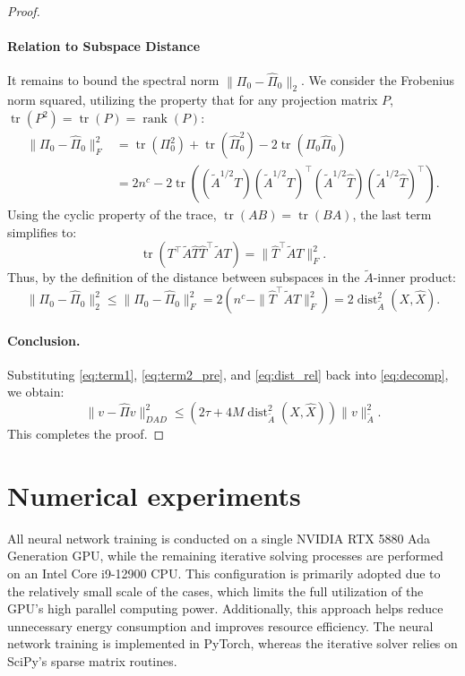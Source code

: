 \documentclass{article}
\DeclareMathOperator{\Dist}{dist}
\theoremstyle{definition}
\theoremstyle{remark}
\begin{document}
\begin{proof}
    \paragraph{Relation to Subspace Distance}
    It remains to bound the spectral norm $\|\Pi_0 - \hat{\Pi}_0\|_2$. We consider the Frobenius norm squared, utilizing the property that for any projection matrix $P$, $\operatorname{tr}(P^2) = \operatorname{tr}(P) = \operatorname{rank}(P)$:
    \[
    \begin{aligned}
        \|\Pi_0 - \hat{\Pi}_0\|_F^2 
        &= \operatorname{tr}(\Pi_0^2) + \operatorname{tr}(\hat{\Pi}_0^2) - 2\operatorname{tr}(\Pi_0 \hat{\Pi}_0) \\
        &= 2 n^c - 2\operatorname{tr}\left( (\tilde{A}^{1/2} T) (\tilde{A}^{1/2} T)^\top (\tilde{A}^{1/2} \hat{T}) (\tilde{A}^{1/2} \hat{T})^\top \right).
    \end{aligned}
    \]
    Using the cyclic property of the trace, $\operatorname{tr}(AB) = \operatorname{tr}(BA)$, the last term simplifies to:
    \[
        \operatorname{tr}\left( T^\top \tilde{A} \hat{T} \hat{T}^\top \tilde{A} T \right) = \| \hat{T}^\top \tilde{A} T \|_F^2.
    \]
    Thus, by the definition of the distance between subspaces in the $\tilde{A}$-inner product:
    \begin{equation}\label{eq:dist_rel}
        \|\Pi_0 - \hat{\Pi}_0\|_2^2 \leq \|\Pi_0 - \hat{\Pi}_0\|_F^2 = 2 \left( n^c - \| \hat{T}^\top \tilde{A} T \|_F^2 \right) = 2 \Dist_{\tilde{A}}^2(X, \hat{X}).
    \end{equation}
    
    \paragraph{Conclusion.}
    Substituting \cref{eq:term1}, \cref{eq:term2_pre}, and \cref{eq:dist_rel} back into \cref{eq:decomp}, we obtain:
    \[
        \|v - \hat{\Pi}v\|_{D A D}^2 \leq \left( 2\tau + 4 M \Dist_{\tilde{A}}^2(X, \hat{X}) \right) \|v\|_{\tilde{A}}^2.
    \]
    This completes the proof.
\end{proof}


\section{Numerical experiments}\label{nume}

All neural network training is conducted on a single NVIDIA RTX 5880 Ada Generation GPU, while the remaining iterative solving processes are performed on an Intel Core i9-12900 CPU.
This configuration is primarily adopted due to the relatively small scale of the cases, which limits the full utilization of the GPU's high parallel computing power. 
Additionally, this approach helps reduce unnecessary energy consumption and improves resource efficiency.
The neural network training is implemented in PyTorch, whereas the iterative solver relies on SciPy's sparse matrix routines.
\end{document}
